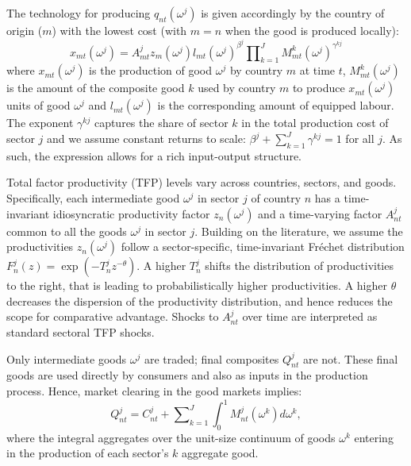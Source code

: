 \documentclass[12pt]{article}
\begin{document}
The technology for producing $q_{nt}(\omega ^{j})$ is given accordingly by
the country of origin ($m$) with the lowest cost (with $m=n$ when the good
is produced locally): 
\begin{equation}
x_{mt}(\omega ^{j})=A_{mt}^{j}z_{m}(\omega ^{j})l_{mt}(\omega ^{j})^{\beta
^{j}}\prod\nolimits_{k=1}^{J}M_{mt}^{k}(\omega ^{j})^{\gamma ^{kj}}
\label{eqinput}
\end{equation}%
where $x_{mt}(\omega ^{j})$ is the production of good $\omega ^{j}$ by
country $m$ at time $t$, $M_{mt}^{k}(\omega ^{j})$ is the amount of the
composite good $k$ used by country $m$ to produce $x_{mt}(\omega ^{j})$
units of good $\omega ^{j}$ and $l_{mt}(\omega ^{j})$ is the corresponding
amount of equipped labour. The exponent $\gamma ^{kj}$ captures the share of
sector $k$ in the total production cost of sector $j$ and we assume constant
returns to scale: $\beta ^{j}+\sum_{k=1}^{J}\gamma ^{kj}=1$ for all $j$. As
such, the expression allows for a rich input-output structure.

Total factor productivity (TFP) levels vary across countries, sectors, and
goods. Specifically, each intermediate good $\omega ^{j}$ in sector $j$ of
country $n$ has a time-invariant idiosyncratic productivity factor $%
z_{n}(\omega ^{j})$ and a time-varying factor $A_{nt}^{j}$ common to all the
goods $\omega ^{j}$ in sector $j$. Building on the literature, we assume the
productivities $z_{n}(\omega ^{j})$ follow a sector-specific, time-invariant
Fr\'{e}chet distribution $F_{n}^{j}(z)=\exp (-T_{n}^{j}z^{-\theta })$. A
higher $T_{n}^{j}$ shifts the distribution of productivities to the right,
that is leading to probabilistically higher productivities. A higher $\theta 
$ decreases the dispersion of the productivity distribution, and hence
reduces the scope for comparative advantage. Shocks to $A_{nt}^{j}$ over
time are interpreted as standard sectoral TFP shocks.

Only intermediate goods $\omega ^{j}$ are traded; final composites $%
Q_{nt}^{j}$ are not. These final goods are used directly by consumers and
also as inputs in the production process. Hence, market clearing in the good
markets implies: 
\begin{equation*}
Q_{nt}^{j}=C_{nt}^{j}+\sum\nolimits_{k=1}^{J}\int_{0}^{1}M_{nt}^{j}(\omega
^{k})d\omega ^{k},
\end{equation*}%
where the integral aggregates over the unit-size continuum of goods $\omega
^{k}$ entering in the production of each sector's $k$ aggregate good.
\end{document}
